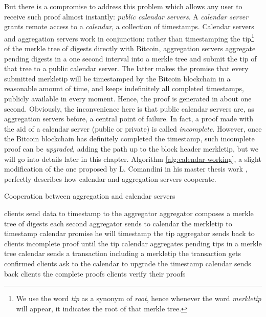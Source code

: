 \bigskip
\noindent
But there is a compromise to address this problem which allows any user to receive such proof almost instantly: \textit{public calendar servers}. A \textit{calendar server} grants remote access to a \textit{calendar}, a collection of timestamps. Calendar servers and aggregation servers work in conjunction: rather than timestamping the tip\footnote{We use the word \textit{tip} as a synonym of \textit{root}, hence whenever the word \textit{merkletip} will appear, it indicates the root of that merkle tree.} of the merkle tree of digests directly with Bitcoin, aggregation servers aggregate pending digests in a one second interval into a merkle tree and submit the tip of that tree to a public calendar server. The latter makes the promise that every submitted merkletip will be timestamped by the Bitcoin blockchain in a reasonable amount of time, and keeps indefinitely all completed timestamps, publicly available in every moment. Hence, the proof is generated in about one second. Obviously, the inconvenience here is that public calendar servers are, as aggregation servers before, a central point of failure. In fact, a proof made with the aid of a calendar server (public or private) is called \textit{incomplete}. However, once the Bitcoin blockchain has definitely completed the timestamp, such incomplete proof can be \textit{upgraded}, adding the path up to the block header merkletip, but we will go into details later in this chapter. Algorithm \ref{alg:calendar-working}, a slight modification of the one proposed by L. Comandini in his master thesis work \cite{Comandini:Thesis:2018}, perfectly describes how calendar and aggregation servers cooperate.

\begin{algorithm}
	\caption{Cooperation between aggregation and calendar servers}
	\label{alg:calendar-working}
	\begin{algorithmic}[1]
		\State clients send data to timestamp to the aggregator\footnotemark {}
		\State aggregator composes a merkle tree of digests each second
		\State aggregator sends to calendar the merkletip to timestamp
		\State calendar promise he will timestamp the tip
		\State aggregator sends back to clients incomplete proof until the tip
		\State calendar aggregates pending tips in a merkle tree
		\State calendar sends a transaction including a merkletip
		\State the transaction gets confirmed 
		\State clients ask to the calendar to upgrade the timestamp
		\State calendar sends back clients the complete proofs
		\State clients verify their proofs
	\end{algorithmic}	
\end{algorithm}

